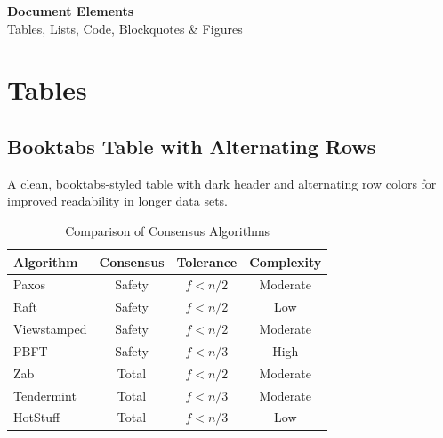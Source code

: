 \documentclass[12pt]{article}
\newcommand{\rowcolorhead}{\rowcolor{tableHead}}   %
\newcommand{\rowcoloralt}{\rowcolor{tableAlt}}      %
\begin{document}
\thispagestyle{empty}

\vspace{18pt}
{\fontsize{24}{28}\selectfont\bfseries\color{titleDark}
  \hspace{22pt}Document Elements}\\[12pt]
{\fontsize{11}{13}\selectfont\color{titleMid}
  \hspace{22pt}Tables, Lists, Code, Blockquotes \& Figures}

\vspace{20pt}

\section{Tables}

\subsection{Booktabs Table with Alternating Rows}
A clean, booktabs-styled table with dark header and alternating row colors
for improved readability in longer data sets.

\vspace{4pt}
\begin{table}[h]
\centering
\caption{Comparison of Consensus Algorithms}
\begin{tabular}{@{} l c c c @{}}
\toprule
\rowcolorhead
\textcolor{tableHeadText}{\textbf{Algorithm}} &
\textcolor{tableHeadText}{\textbf{Consensus}} &
\textcolor{tableHeadText}{\textbf{Tolerance}} &
\textcolor{tableHeadText}{\textbf{Complexity}} \\
\midrule
Paxos        & Safety    & $f < n/2$       & Moderate \\
\rowcoloralt
Raft         & Safety    & $f < n/2$       & Low      \\
Viewstamped  & Safety    & $f < n/2$       & Moderate \\
\rowcoloralt
PBFT         & Safety    & $f < n/3$       & High     \\
Zab          & Total     & $f < n/2$       & Moderate \\
\rowcoloralt
Tendermint   & Total     & $f < n/3$       & Moderate \\
HotStuff     & Total     & $f < n/3$       & Low      \\
\bottomrule
\end{tabular}
\end{table}
\end{document}
